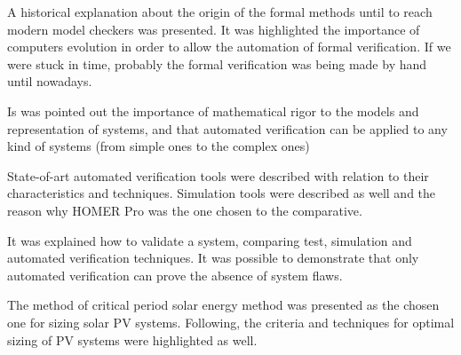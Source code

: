 A historical explanation about the origin of the formal methods until to reach modern model checkers was presented. It was highlighted the importance of computers evolution in order to allow the automation of formal verification. If we were stuck in time, probably the formal verification was being made by hand until nowadays.

Is was pointed out the importance of mathematical rigor to the models and representation of systems, and that automated verification can be applied to any kind of systems (from simple ones to the complex ones)

State-of-art automated verification tools were described with relation to their characteristics and techniques. Simulation tools were described as well and the reason why HOMER Pro was the one chosen to the comparative.

It was explained how to validate a system, comparing test, simulation and automated verification techniques. It was possible to demonstrate that only automated verification can prove the absence of system flaws.

The method of critical period solar energy method was presented as the chosen one for sizing solar PV systems. Following, the criteria and techniques for optimal sizing of PV systems were highlighted as well.

